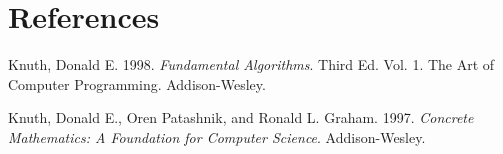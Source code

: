 \documentclass[]{article}
\begin{document}
\section*{References}\label{references}

\hypertarget{refs}{}
\hypertarget{ref-taocp1}{}
Knuth, Donald E. 1998. \emph{Fundamental Algorithms}. Third Ed. Vol. 1.
The Art of Computer Programming. Addison-Wesley.

\hypertarget{ref-concrete}{}
Knuth, Donald E., Oren Patashnik, and Ronald L. Graham. 1997.
\emph{Concrete Mathematics: A Foundation for Computer Science}.
Addison-Wesley.
\end{document}
